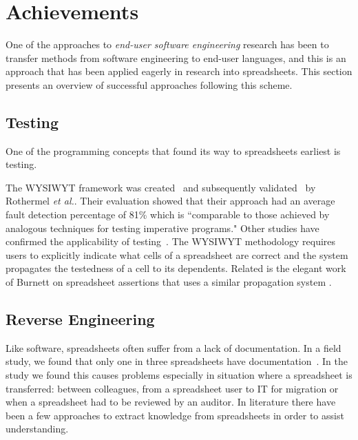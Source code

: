 \documentclass[conference]{IEEEtran}
\begin{document}
\section{Achievements} 
One of the approaches to \emph{end-user software engineering} research has been to transfer methods from software engineering to end-user languages, and this is an approach that has been applied eagerly in research into spreadsheets. This section presents an overview of successful approaches following this scheme.

\subsection{Testing}
One of the programming concepts that found its way to spreadsheets earliest is testing. 


The WYSIWYT framework was created~\cite{Rothermel1997} and subsequently validated~\cite{Rothermel2000} by Rothermel \emph{et al.}. Their evaluation showed that their approach had an average fault detection percentage of 81\% which is ``comparable to those achieved by analogous techniques for testing imperative programs." Other studies have confirmed the applicability of testing~\cite{Kruck2006}. The WYSIWYT methodology requires users to explicitly indicate what cells of a spreadsheet are correct and the system propagates the testedness of a cell to its dependents. Related is the elegant work of Burnett on spreadsheet assertions that uses a similar propagation system \cite{Burnett2003}.

\subsection{Reverse Engineering} 
Like software, spreadsheets often suffer from a lack of documentation. In a field study, we found that only one in three spreadsheets have documentation~\cite{hermans_supporting_2011}. In the study we found this causes problems especially in situation where a spreadsheet is transferred: between colleagues, from a spreadsheet user to IT for migration or when a spreadsheet had to be reviewed by an auditor. In literature there have been a few approaches to extract knowledge from spreadsheets in order to assist understanding. 
\end{document}

